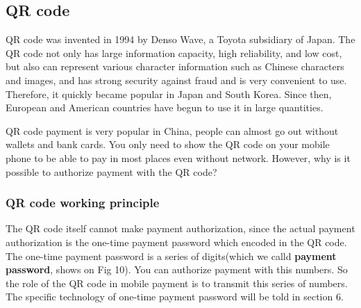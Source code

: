 \documentclass[journal]{IEEEtran}
\begin{document}
\subsection{QR code}
QR code was invented in 1994 by Denso Wave, a Toyota subsidiary of Japan. The QR code not only has large information capacity, high reliability, and low cost, but also can represent various character information such as Chinese characters and images, and has strong security against fraud and is very convenient to use. Therefore, it quickly became popular in Japan and South Korea. Since then, European and American countries have begun to use it in large quantities. 

QR code payment is very popular in China, people can almost go out without wallets and bank cards. You only need to show the QR code on your mobile phone to be able to pay in most places even without network. However, why is it possible to authorize payment with the QR code?



\subsubsection{QR code working principle}

The QR code itself cannot make payment authorization, since the actual payment authorization is the one-time payment password which encoded in the QR code. The one-time payment password is a series of digits(which we calld \textbf{payment password}, shows on Fig 10). You can authorize payment with this numbers. So the role of the QR code in mobile payment is to transmit this series of numbers. The specific technology of one-time payment password will be told in section 6.
\end{document}
